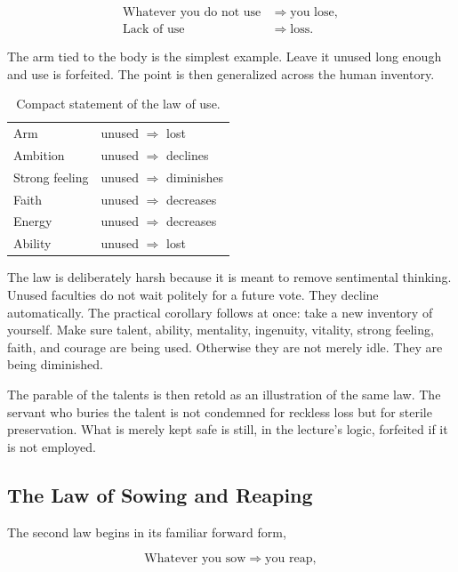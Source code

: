 \begin{align}
\text{Whatever you do not use} &\Longrightarrow \text{you lose},\\
\text{Lack of use} &\Longrightarrow \text{loss}.
\end{align}

The arm tied to the body is the simplest example. Leave it unused long enough and use is forfeited. The point is then generalized across the human inventory.

\begin{table}[h]
\centering
\begin{tabular}{ll}
Arm & unused \(\Longrightarrow\) lost \\
Ambition & unused \(\Longrightarrow\) declines \\
Strong feeling & unused \(\Longrightarrow\) diminishes \\
Faith & unused \(\Longrightarrow\) decreases \\
Energy & unused \(\Longrightarrow\) decreases \\
Ability & unused \(\Longrightarrow\) lost
\end{tabular}
\caption{Compact statement of the law of use.}
\end{table}

The law is deliberately harsh because it is meant to remove sentimental thinking. Unused faculties do not wait politely for a future vote. They decline automatically. The practical corollary follows at once: take a new inventory of yourself. Make sure talent, ability, mentality, ingenuity, vitality, strong feeling, faith, and courage are being used. Otherwise they are not merely idle. They are being diminished.

The parable of the talents is then retold as an illustration of the same law. The servant who buries the talent is not condemned for reckless loss but for sterile preservation. What is merely kept safe is still, in the lecture's logic, forfeited if it is not employed.

\subsection{The Law of Sowing and Reaping}

The second law begins in its familiar forward form,

\begin{equation}
\text{Whatever you sow} \Longrightarrow \text{you reap},
\end{equation}

